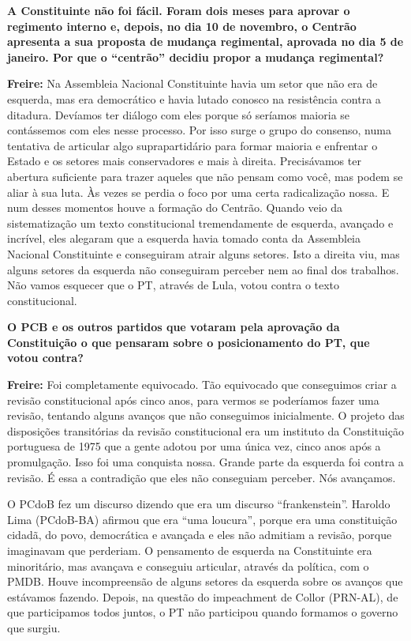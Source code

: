 \textbf{A Constituinte não foi fácil. Foram dois meses para aprovar o
regimento interno e, depois, no dia 10 de novembro, o Centrão apresenta
a sua proposta de mudança regimental, aprovada no dia 5 de janeiro. Por
que o ``centrão'' decidiu propor a mudança regimental?}

\textbf{Freire:} Na Assembleia Nacional Constituinte havia um setor que
não era de esquerda, mas era democrático e havia lutado conosco na
resistência contra a ditadura. Devíamos ter diálogo com eles porque só
seríamos maioria se contássemos com eles nesse processo. Por isso surge
o grupo do consenso, numa tentativa de articular algo suprapartidário
para formar maioria e enfrentar o Estado e os setores mais conservadores
e mais à direita. Precisávamos ter abertura suficiente para trazer
aqueles que não pensam como você, mas podem se aliar à sua luta. Às
vezes se perdia o foco por uma certa radicalização nossa. E num desses
momentos houve a formação do Centrão. Quando veio da sistematização um
texto constitucional tremendamente de esquerda, avançado e incrível,
eles alegaram que a esquerda havia tomado conta da Assembleia Nacional
Constituinte e conseguiram atrair alguns setores. Isto a direita viu,
mas alguns setores da esquerda não conseguiram perceber nem ao final dos
trabalhos. Não vamos esquecer que o PT, através de Lula, votou contra o
texto constitucional.

\textbf{O PCB e os outros partidos que votaram pela aprovação da
Constituição o que pensaram sobre o posicionamento do PT, que votou
contra?}

\textbf{Freire:} Foi completamente equivocado. Tão equivocado que
conseguimos criar a revisão constitucional após cinco anos, para vermos
se poderíamos fazer uma revisão, tentando alguns avanços que não
conseguimos inicialmente. O projeto das disposições transitórias da
revisão constitucional era um instituto da Constituição portuguesa de
1975 que a gente adotou por uma única vez, cinco anos após a
promulgação. Isso foi uma conquista nossa. Grande parte da esquerda foi
contra a revisão. É essa a contradição que eles não conseguiam perceber.
Nós avançamos.

O PCdoB fez um discurso dizendo que era um discurso ``frankenstein''.
Haroldo Lima (PCdoB-BA) afirmou que era ``uma loucura'', porque era uma
constituição cidadã, do povo, democrática e avançada e eles não admitiam
a revisão, porque imaginavam que perderiam. O pensamento de esquerda na
Constituinte era minoritário, mas avançava e conseguiu articular,
através da política, com o PMDB. Houve incompreensão de alguns setores
da esquerda sobre os avanços que estávamos fazendo. Depois, na questão
do impeachment de Collor (PRN-AL), de que participamos todos juntos, o
PT não participou quando formamos o governo que surgiu.

